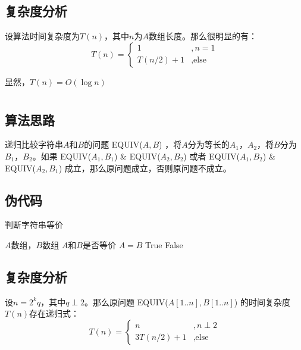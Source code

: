 \documentclass[UTF8]{ctexart}
\begin{document}
\subsection*{复杂度分析}
设算法时间复杂度为$T(n)$，其中$n$为$A$数组长度。那么很明显的有：
\begin{equation*}
    T(n) = 
    \begin{cases}
        1 &, n=1 \\
        T(n/2) + 1 &, \text{else}
    \end{cases}
\end{equation*}

显然，$T(n) = O(\log n)$

\section{}
\subsection*{算法思路}
递归比较字符串$A$和$B$的问题 EQUIV($A, B$) ，将$A$分为等长的$A_1$，$A_2$，将$B$分为$B_1$，$B_2$。如果 EQUIV($A_1, B_1$) \& EQUIV($A_2, B_2$) 或者 EQUIV($A_1, B_2$) \& EQUIV($A_2, B_1$) 成立，那么原问题成立，否则原问题不成立。

\subsection*{伪代码}
\begin{algorithm}
    \caption{判断字符串等价}
    \begin{algorithmic}[1]
        \Require $A$数组，$B$数组
        \Ensure $A$和$B$是否等价
                \State \Return $A=B$
            \EndIf
                \State \Return True
            \Else
                \State \Return False
            \EndIf
        \EndFunction
    \end{algorithmic}
\end{algorithm}

\subsection*{复杂度分析}
设$n=2^kq$，其中$q\perp 2$。那么原问题 EQUIV($A[1..n], B[1..n]$) 的时间复杂度$T(n)$存在递归式：
\begin{equation*}
    T(n) = 
    \begin{cases}
        n &, n\perp 2 \\
        3T(n/2) + 1 &, \text{else}
    \end{cases}
\end{equation*}
\end{document}
